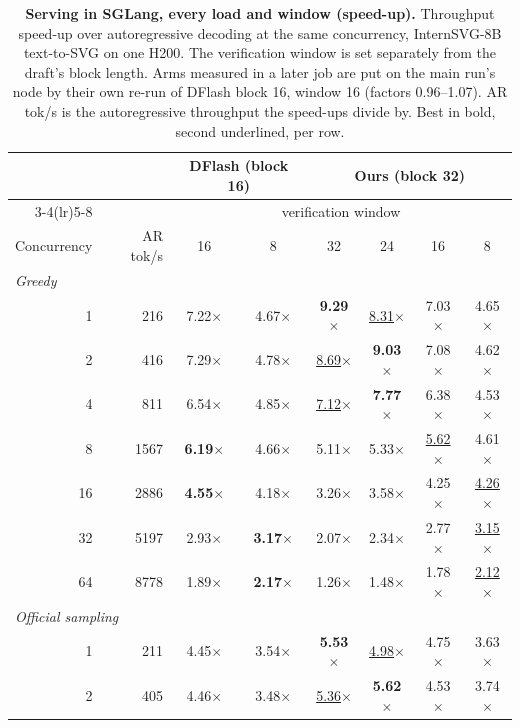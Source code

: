 \begin{table}[t]
\caption{\textbf{Serving in SGLang, every load and window (speed-up).} Throughput speed-up over autoregressive decoding at the same concurrency, InternSVG-8B text-to-SVG on one H200. The verification window is set separately from the draft's block length. Arms measured in a later job are put on the main run's node by their own re-run of DFlash block 16, window 16 (factors 0.96--1.07). AR tok/s is the autoregressive throughput the speed-ups divide by. Best in bold, second underlined, per row.}
\label{app:p5-speed}
\centering
\footnotesize
\setlength{\tabcolsep}{1.2pt}
\begin{tabular*}{\columnwidth}{@{\extracolsep{\fill}}rr*{6}{c}@{}}
\toprule
 & & \multicolumn{2}{c}{DFlash (block 16)} & \multicolumn{4}{c}{\textbf{Ours} (block 32)} \\
\cmidrule(lr){3-4}\cmidrule(lr){5-8}
 & & \multicolumn{6}{c}{verification window} \\
Concurrency & AR tok/s & 16 & 8 & 32 & 24 & 16 & 8 \\
\midrule
\multicolumn{8}{l}{\textit{Greedy}} \\
1 & 216 & 7.22$\times$ & 4.67$\times$ & \textbf{9.29}$\times$ & \underline{8.31}$\times$ & 7.03$\times$ & 4.65$\times$ \\
2 & 416 & 7.29$\times$ & 4.78$\times$ & \underline{8.69}$\times$ & \textbf{9.03}$\times$ & 7.08$\times$ & 4.62$\times$ \\
4 & 811 & 6.54$\times$ & 4.85$\times$ & \underline{7.12}$\times$ & \textbf{7.77}$\times$ & 6.38$\times$ & 4.53$\times$ \\
8 & 1567 & \textbf{6.19}$\times$ & 4.66$\times$ & 5.11$\times$ & 5.33$\times$ & \underline{5.62}$\times$ & 4.61$\times$ \\
16 & 2886 & \textbf{4.55}$\times$ & 4.18$\times$ & 3.26$\times$ & 3.58$\times$ & 4.25$\times$ & \underline{4.26}$\times$ \\
32 & 5197 & 2.93$\times$ & \textbf{3.17}$\times$ & 2.07$\times$ & 2.34$\times$ & 2.77$\times$ & \underline{3.15}$\times$ \\
64 & 8778 & 1.89$\times$ & \textbf{2.17}$\times$ & 1.26$\times$ & 1.48$\times$ & 1.78$\times$ & \underline{2.12}$\times$ \\
\midrule
\multicolumn{8}{l}{\textit{Official sampling}} \\
1 & 211 & 4.45$\times$ & 3.54$\times$ & \textbf{5.53}$\times$ & \underline{4.98}$\times$ & 4.75$\times$ & 3.63$\times$ \\
2 & 405 & 4.46$\times$ & 3.48$\times$ & \underline{5.36}$\times$ & \textbf{5.62}$\times$ & 4.53$\times$ & 3.74$\times$ \\

\end{tabular*}
\end{table}
